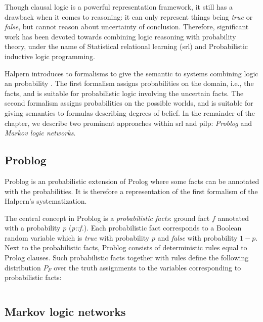 Though clausal logic is a powerful representation framework, it still has a drawback when it comes to reasoning: it can only represent things being \textit{true} or \textit{false}, but cannot reason about uncertainty of conclusion.
Therefore, significant work has been devoted towards combining logic reasoning with probability theory, under the name of Statistical relational learning (\gls{srl}) and Probabilistic inductive logic programming.




Halpern introduces to formalisms to give the semantic to systems combining logic an probability \cite{Halpern90ananalysis}.
The first formalism assigns probabilities on the domain, i.e., the facts, and is suitable for probabilistic logic involving the uncertain facts.
The second formalism assigns probabilities on the possible worlds, and is suitable for giving semantics to formulas describing degrees of belief.
In the remainder of the chapter, we describe two prominent approaches within \gls{srl} and \gls{pilp}: \textit{Problog} and \textit{Markov logic networks}.


\subsection{Problog}

Problog is an probabilistic extension of Prolog where some facts can be annotated with the probabilities.
It is therefore a representation of the first formalism of the Halpern's systematization.

The central concept in Problog is a \textit{probabilistic facts}: ground fact $f$ annotated with a probability $p$ (\textit{p::f.}).
Each probabilistic fact corresponds to a Boolean random variable which is \textit{true} with probability $p$ and \textit{false} with probability $1-p$.
Next to the probabilistic facts, Problog consists of deterministic rules equal to Prolog clauses.
Such probabilistic facts together with rules define the following distribution $P_{F}$ over the truth assignments to the variables corresponding to probabilistic facts:

$$ $$

\subsection{Markov logic networks}












\cleardoublepage

